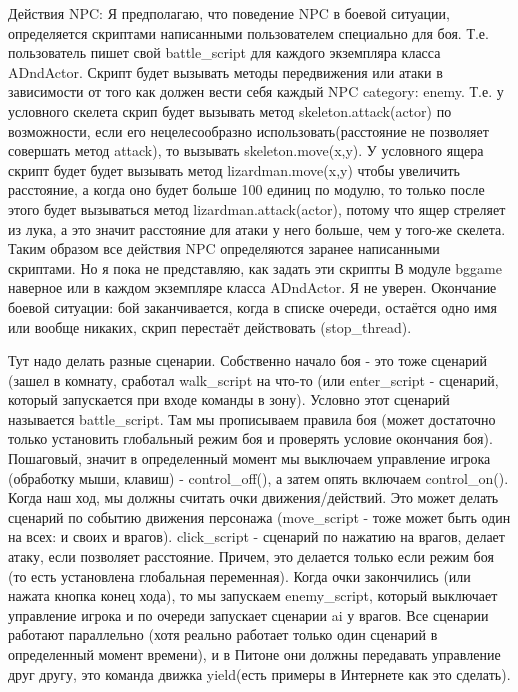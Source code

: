 Действия NPC: Я предполагаю, что поведение NPC в боевой ситуации, определяется скриптами написанными пользователем специально для боя. Т.е. пользователь пишет свой battle\_script для каждого экземпляра класса ADndActor. Скрипт будет вызывать методы передвижения или атаки в зависимости от того как должен вести себя каждый NPC category: enemy. Т.е. у условного скелета скрип будет вызывать метод skeleton.attack(actor) по возможности, если его нецелесообразно использовать(расстояние не позволяет совершать метод attack), то вызывать skeleton.move(x,y). У условного ящера скрипт будет будет вызывать метод lizardman.move(x,y) чтобы увеличить расстояние, а когда оно будет больше 100 единиц по модулю, то только после этого будет вызываться метод lizardman.attack(actor), потому что ящер стреляет из лука, а это значит расстояние для атаки у него больше, чем у того-же скелета. Таким образом все действия NPC определяются заранее написанными скриптами. Но я пока не представляю, как задать эти скрипты В модуле bggame наверное или в каждом экземпляре класса ADndActor. Я не уверен.
Окончание боевой ситуации: бой заканчивается, когда в списке очереди, остаётся одно имя или вообще никаких, скрип перестаёт действовать (stop\_thread).

Тут надо делать разные сценарии. Собственно начало боя - это тоже сценарий (зашел в комнату, сработал walk\_script на что-то (или enter\_script - сценарий, который запускается при входе команды в зону). Условно этот сценарий называется battle\_script. Там мы прописываем правила боя (может достаточно только установить глобальный режим боя и проверять условие окончания боя). Пошаговый, значит в определенный момент мы выключаем управление игрока (обработку мыши, клавиш) - control\_off(), а затем опять включаем control\_on(). Когда наш ход, мы должны считать очки движения/действий. Это может делать сценарий по событию движения персонажа (move\_script - тоже может быть один на всех: и своих и врагов).
click\_script - сценарий по нажатию на врагов, делает атаку, если позволяет расстояние. Причем, это делается только если режим боя (то есть установлена глобальная переменная). Когда очки закончились (или нажата кнопка конец хода), то мы запускаем enemy\_script, который выключает управление игрока и по очереди запускает сценарии ai у врагов. Все сценарии работают параллельно (хотя реально работает только один сценарий в определенный момент времени), и в Питоне они должны передавать управление друг другу, это команда движка yield(есть примеры в Интернете как это сделать).

